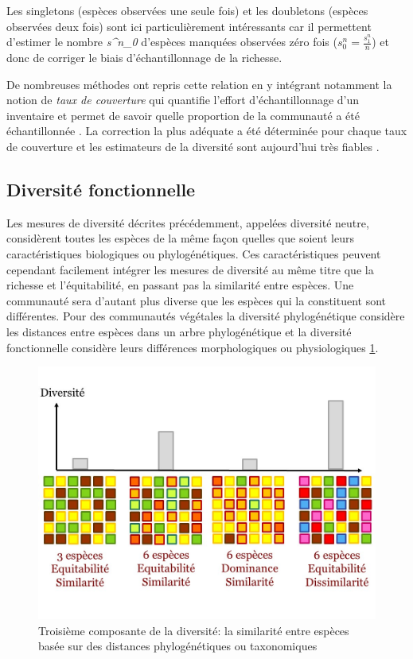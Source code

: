 \documentclass[
  11pt,
  french,
  A4paper,
  extrafontsizes,onecolumn,openright
  ]{memoir}
\begin{document}
Les singletons (espèces observées une seule fois) et les doubletons
(espèces observées deux fois) sont ici particulièrement intéressants car
il permettent d'estimer le nombre \emph{s\^{}n\_0} d'espèces manquées
observées zéro fois (\(s^n_0=\frac{s^n_1}{n}\)) et donc de corriger le
biais d'échantillonnage de la richesse.

De nombreuses méthodes ont repris cette relation en y intégrant
notamment la notion de \emph{taux de couverture} qui quantifie l'effort
d'échantillonnage d'un inventaire et permet de savoir quelle proportion
de la communauté a été échantillonnée \autocite{Dauby2012}. La
correction la plus adéquate a été déterminée pour chaque taux de
couverture et les estimateurs de la diversité sont aujourd'hui très
fiables \autocites{Chao2015}{Marcon2015b}.

\subsection{Diversité fonctionnelle}\label{diversite-fonctionnelle}

Les mesures de diversité décrites précédemment, appelées diversité
neutre, considèrent toutes les espèces de la même façon quelles que
soient leurs caractéristiques biologiques ou phylogénétiques. Ces
caractéristiques peuvent cependant facilement intégrer les mesures de
diversité au même titre que la richesse et l'équitabilité, en passant
pas la similarité entre espèces. Une communauté sera d'autant plus
diverse que les espèces qui la constituent sont différentes. Pour des
communautés végétales la diversité phylogénétique considère les
distances entre espèces dans un arbre phylogénétique et la diversité
fonctionnelle considère leurs différences morphologiques ou
physiologiques \ref{fig:RichEquSim}.

\begin{figure}

{\centering \includegraphics[width=0.6\linewidth]{ExternalFig/Fig_RichnessEquitabilitySimilarity} 

}

\caption{Troisième composante de la diversité: la similarité entre espèces basée sur des distances phylogénétiques ou taxonomiques}\label{fig:RichEquSim}
\end{figure}
\end{document}
